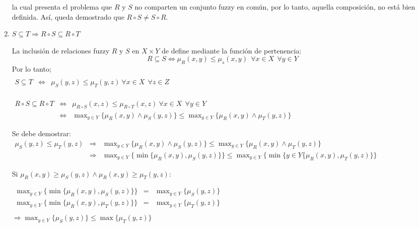 \documentclass[letterpaper,spanish,11pt]{article}
\begin{document}
\begin{enumerate}
la cual presenta el problema que $R$ y $S$ no comparten un conjunto fuzzy en
com\'{u}n, por lo tanto, aquella composici\'{o}n, no est\'{a} bien definida.
As\'{i}, queda demostrado que $R \circ S  \neq S \circ R$.

\item $S \subseteq T \Rightarrow R \circ S  \subseteq R \circ T$

La inclusi\'{o}n de relaciones fuzzy $R$ y $S$ en $X\times Y$ de define
mediante la funci\'{o}n de pertenencia:
$$R \subseteq S \Leftrightarrow \mu_{R}(x,y) \leq \mu_{s}(x,y) \ \ \forall x \in X \ \ \forall y \in Y$$
Por lo tanto;\\

$\begin{array}{lll}\\
S \subseteq T &\Leftrightarrow & \mu_{S}(y,z) \leq \mu_{T}(y,z) \ \forall  x \in X \ \ \forall z \in Z \\
\end{array}$

$\begin{array}{lll}
R \circ S \subseteq R\circ T &\Leftrightarrow &\mu_{R\circ S}(x,z) \leq \mu_{R\circ T}(x,z) \ \forall  x \in X \ \ \forall y \in Y \\ 
 &\Leftrightarrow & \max_{y \in Y}\{ \mu_{R}(x,y) \wedge \mu_{S}(y,z) \} \leq \max_{y \in Y}\{ \mu_{R}(x,y) \wedge \mu_{T}(y,z) \}
\end{array}$

Se debe demostrar:\\

$\begin{array}{lll}
\mu_{S}(y,z) \leq \mu_{T}(y,z) &\Rightarrow &\max_{y \in Y}\{ \mu_{R}(x,y) \wedge \mu_{S}(y,z) \} \leq \max_{y \in Y}\{ \mu_{R}(x,y) \wedge \mu_{T}(y,z)\} \\
&\Rightarrow & \max_{y \in Y}\{ \min\{\mu_{R}(x,y),\mu_{S}(y,z)\} \} \leq \max_{y\in Y}{\{\min\{y \in Y}\{ \mu_{R}(x,y),\mu_{T}(y,z)\}\}
\end{array}$

Si $\mu_{R}(x,y) \geq \mu_{S}(y,z) \wedge \mu_{R}(x,y) \geq \mu_{T}(y,z)$:

$\begin{array}{lll} 
\max_{y\in Y}\{\min\{\mu_{R}(x,y),\mu_{S}(y,z)\}\} &= &\max_{y\in Y}\{\mu_{S}(y,z)\}\\
\max_{y\in Y}\{\min\{ \mu_{R}(x,y),\mu_{T}(y,z)\}\} &= &\max_{y\in Y}\{\mu_{T}(y,z)\}\\
\end{array}$\\
$\Rightarrow \max_{y\in Y}\{\mu_{S}(y,z)\} \leq \max\{\mu_{T}(y,z)\}$



\end{enumerate}
\end{document}
